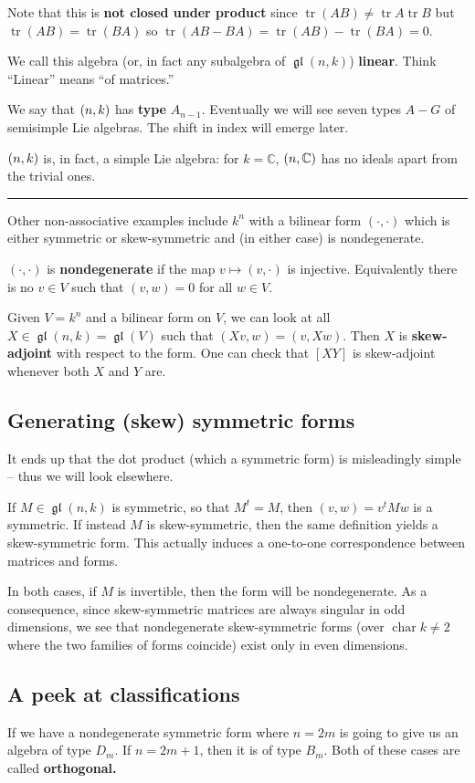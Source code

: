 \documentclass[12pt]{article}
\theoremstyle{nonumberbreak}
\theoremstyle{changebreak}
\theoremstyle{nonumberbreak}
\theoremstyle{change}
\newcommand*{\C}{
\mathbb{C}
}
\newcommand*{\brk}{
\rule{2in}{.1pt}
}
\DeclareMathOperator{\ch}{char}
\DeclareMathOperator{\gl}{\mathfrak{gl}}
\let\sl\relax
\DeclareMathOperator{\sl}{\mathfrak{sl}}
\DeclareMathOperator{\tr}{tr}
\begin{document}
Note that this is \textbf{not closed under product} since $\tr(AB)\ne\tr A\tr B$ but $\tr(AB)=\tr(BA)$
so $\tr(AB-BA)=\tr(AB)-\tr(BA)=0$.
\begin{defn}
	We call this algebra (or, in fact any subalgebra of $\gl(n,k)$) \textbf{linear}. Think 
	``Linear'' means ``of matrices.''
\end{defn}

We say that $\sl(n,k)$ has \textbf{type} $A_{n-1}$. Eventually we will see seven types
$A-G$ of semisimple Lie algebras. The shift in index will emerge later.

$\sl(n,k)$ is, in fact, a simple Lie algebra: for $k=\C$, $\sl(n,\C)$ has no ideals
apart from the trivial ones. 

\brk

Other non-associative examples include $k^n$ with a bilinear form $(\cdot,\cdot)$ which
is either symmetric or skew-symmetric and (in either case) is nondegenerate.
\begin{defn}
	$(\cdot,\cdot)$ is \textbf{nondegenerate} if the map $v\mapsto (v,\cdot)$ is injective. Equivalently
	there is no $v\in V$ such that $(v,w)=0$ for all $w\in V$.
\end{defn}

Given $V=k^n$ and a bilinear form on $V$, we can look at all $X\in \gl(n,k)=\gl(V)$ such that 
$(Xv,w)=(v,Xw)$. Then $X$ is \textbf{skew-adjoint} with respect to the form. One can check that 
$[XY]$ is skew-adjoint whenever both $X$ and $Y$ are.

\subsection{Generating (skew) symmetric forms}
It ends up that the dot product (which a symmetric form) is misleadingly simple -- thus
we will look elsewhere.

If $M\in \gl(n,k)$ is symmetric, so that $M^t=M$, then $(v,w)=v^tMw$ is a symmetric. If 
instead $M$ is skew-symmetric, then the same definition yields a skew-symmetric form. 
This actually induces a one-to-one correspondence between matrices and forms.

In both cases, if $M$ is invertible, then the form will be nondegenerate. As a consequence, 
since skew-symmetric matrices are always singular in odd dimensions, we see that 
nondegenerate skew-symmetric forms (over $\ch k\ne 2$ where the two families of forms
coincide) exist only in even dimensions.

\subsection{A peek at classifications}
If we have a nondegenerate symmetric form where $n=2m$ is going to give us an algebra
of type $D_m$. If $n=2m+1$, then it is of type $B_m$. Both of these cases are called
\textbf{orthogonal.}
\end{document}

